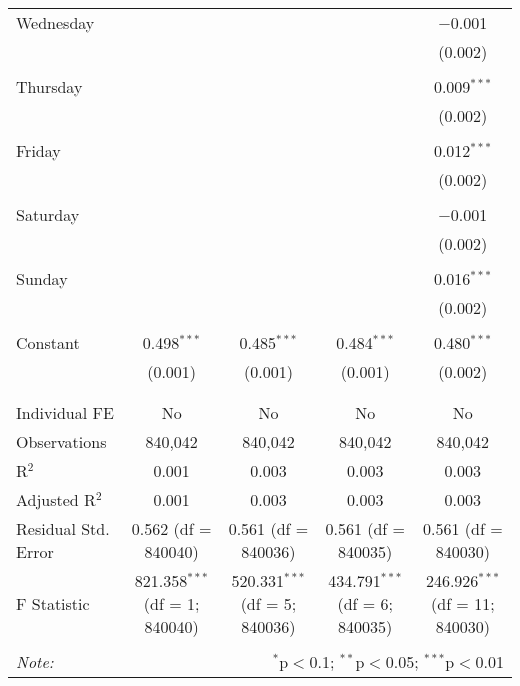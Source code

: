\documentclass[
]{article}
\begin{document}
\begin{table}[!htbp]
{\begin{tabular}{@{\extracolsep{5pt}}lcccc}
 Wednesday &  &  &  & $-$0.001 \\ 
  &  &  &  & (0.002) \\ 
  & & & & \\ 
 Thursday &  &  &  & 0.009$^{***}$ \\ 
  &  &  &  & (0.002) \\ 
  & & & & \\ 
 Friday &  &  &  & 0.012$^{***}$ \\ 
  &  &  &  & (0.002) \\ 
  & & & & \\ 
 Saturday &  &  &  & $-$0.001 \\ 
  &  &  &  & (0.002) \\ 
  & & & & \\ 
 Sunday &  &  &  & 0.016$^{***}$ \\ 
  &  &  &  & (0.002) \\ 
  & & & & \\ 
 Constant & 0.498$^{***}$ & 0.485$^{***}$ & 0.484$^{***}$ & 0.480$^{***}$ \\ 
  & (0.001) & (0.001) & (0.001) & (0.002) \\ 
  & & & & \\ 
\hline \\[-1.8ex] 
Individual FE & No & No & No & No \\ 
Observations & 840,042 & 840,042 & 840,042 & 840,042 \\ 
R$^{2}$ & 0.001 & 0.003 & 0.003 & 0.003 \\ 
Adjusted R$^{2}$ & 0.001 & 0.003 & 0.003 & 0.003 \\ 
Residual Std. Error & 0.562 (df = 840040) & 0.561 (df = 840036) & 0.561 (df = 840035) & 0.561 (df = 840030) \\ 
F Statistic & 821.358$^{***}$ (df = 1; 840040) & 520.331$^{***}$ (df = 5; 840036) & 434.791$^{***}$ (df = 6; 840035) & 246.926$^{***}$ (df = 11; 840030) \\ 
\hline 
\hline \\[-1.8ex] 
\textit{Note:}  & \multicolumn{4}{r}{$^{*}$p$<$0.1; $^{**}$p$<$0.05; $^{***}$p$<$0.01} \\ 
\end{tabular}
} 
\end{table} 
\newpage
\end{document}
